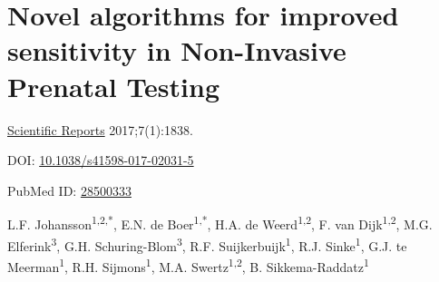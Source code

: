 \chapter[Novel algorithms for improved sensitivity in NIPT]{Novel algorithms for improved sensitivity in Non-Invasive Prenatal Testing}
\label{chap:algorithms_NIPT}

{ \Large {} }

\hfill \underline{Scientific Reports} 2017;7(1):1838.

\hfill DOI: \href{https://doi.org/10.1038/s41598-017-02031-5}{10.1038/s41598-017-02031-5}

\hfill PubMed ID: \href{https://www.ncbi.nlm.nih.gov/pubmed/28500333}{28500333}

\newpage

\noindent
L.F. Johansson\textsuperscript{1,2,*}, E.N. de Boer\textsuperscript{1,*}, H.A. de Weerd\textsuperscript{1,2}, F. van Dijk\textsuperscript{1,2}, M.G. Elferink\textsuperscript{3}, G.H. Schuring-Blom\textsuperscript{3}, R.F. Suijkerbuijk\textsuperscript{1}, R.J. Sinke\textsuperscript{1}, G.J. te Meerman\textsuperscript{1}, R.H. Sijmons\textsuperscript{1}, M.A. Swertz\textsuperscript{1,2}, B. Sikkema-Raddatz\textsuperscript{1}\\

